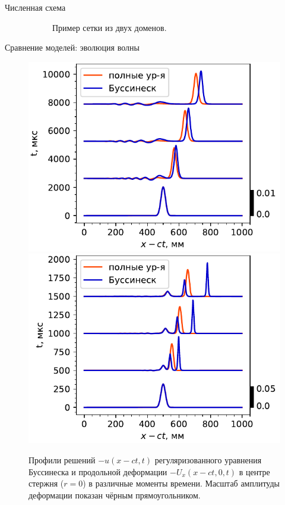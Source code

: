 \documentclass{beamer}
\begin{document}
\begin{frame}{Численная схема}
\begin{figure}[h!]
\begin{subfigure}{0.4\linewidth}
	\footnotesize
	\hspace*{3.5mm}Пример сетки из двух доменов.
	\vspace{10mm}
	\end{subfigure}
\end{figure}
\end{frame}


\begin{frame}{Сравнение моделей: эволюция волны}
\begin{figure}[h]
	\centering
	\includegraphics[width=0.49\linewidth]{figures/SolEvolCompareSmallColor}
	\includegraphics[width=0.49\linewidth]{figures/SolEvolCompareSmallColor2}
	\caption{Профили решений $-u(x-ct, t)$ регуляризованного уравнения Буссинеска и продольной деформации $-U_x(x - ct, 0, t)$ в центре стержня ($r=0$) в различные моменты времени. Масштаб амплитуды деформации показан чёрным прямоугольником.}
\end{figure}
\end{frame}
\end{document}
